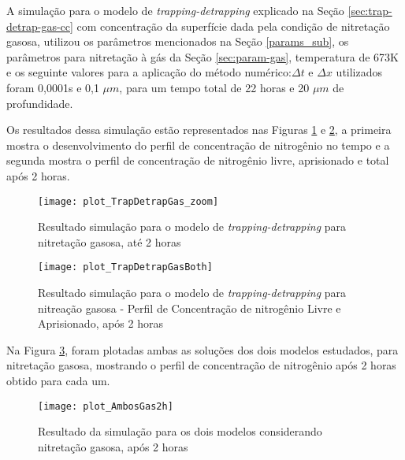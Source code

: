 \FloatBarrier
{}



A simulação para o modelo de \textit{trapping-detrapping} explicado na Seção \ref{sec:trap-detrap-gas-cc} com concentração da superfície dada pela condição de nitretação gasosa, utilizou os parâmetros mencionados na Seção \ref{params_sub}, os parâmetros para nitretação à gás da Seção \ref{sec:param-gas}, temperatura de 673K e os seguinte valores para a aplicação do método numérico:$\Delta t$ e $\Delta x$ utilizados foram 0,0001s e 0,1 $\mu m$, para um tempo total de 22 horas e 20 $\mu m$ de profundidade.

Os resultados dessa simulação estão representados nas Figuras \ref{fig:td-csvar-gas} e \ref{fig:td-csvar-gas-both}, a primeira mostra o desenvolvimento do perfil de concentração de nitrogênio no tempo e a segunda mostra o perfil de concentração de nitrogênio livre, aprisionado e total após 2 horas.

\begin{figure}[ht]
\centering
	\caption{Resultado simulação para o modelo de \textit{trapping-detrapping} para nitretação gasosa, até 2 horas}
	\texttt{[image: plot\_TrapDetrapGas\_zoom]}
	\label{fig:td-csvar-gas}
	\centering
\end{figure}


\begin{figure}[ht]
\centering
	\caption{Resultado simulação para o modelo de \textit{trapping-detrapping} para nitreação gasosa - Perfil de Concentração de nitrogênio Livre e Aprisionado, após 2 horas }
	\texttt{[image: plot\_TrapDetrapGasBoth]}
	\label{fig:td-csvar-gas-both}
	\centering
\end{figure}

Na Figura \ref{fig:td-csvar-gas-compara}, foram plotadas ambas as soluções dos dois modelos estudados, para nitretação gasosa, mostrando o perfil de concentração de nitrogênio após 2 horas obtido para cada um.

\begin{figure}[ht]
\centering
	\caption{Resultado da simulação para os dois modelos considerando nitretação gasosa, após 2 horas }
	\texttt{[image: plot\_AmbosGas2h]}
	\label{fig:td-csvar-gas-compara}
	\centering
\end{figure}
\FloatBarrier